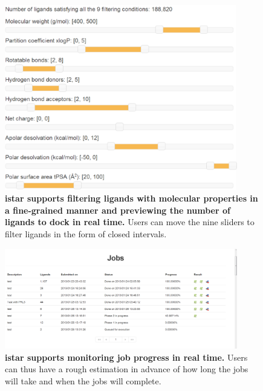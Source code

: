 \documentclass[10pt]{article}
\begin{document}
\begin{figure}[!ht]
\begin{center}
\includegraphics[width=4in]{Slider.eps}
\end{center}
\caption{
{\bf istar supports filtering ligands with molecular properties in a fine-grained manner and previewing the number of ligands to dock in real time.} Users can move the nine sliders to filter ligands in the form of closed intervals.
}
\label{Slider}
\end{figure}

\begin{figure}[!ht]
\begin{center}
\includegraphics[width=4in]{Progress.eps}
\end{center}
\caption{
{\bf istar supports monitoring job progress in real time.} Users can thus have a rough estimation in advance of how long the jobs will take and when the jobs will complete.
}
\label{Progress}
\end{figure}
\end{document}
